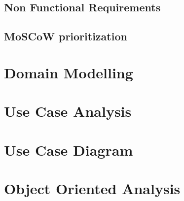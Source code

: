 \subsection{Non Functional Requirements}
\label{sub:non_functional_req}

\subsection{MoSCoW prioritization}
\label{sub:moscow}


\blindtext
\section{Domain Modelling}
\blindtext
\section{Use Case Analysis}
\blindtext
\section{Use Case Diagram}
\section{Object Oriented Analysis}



\blindtext
\blindtext

